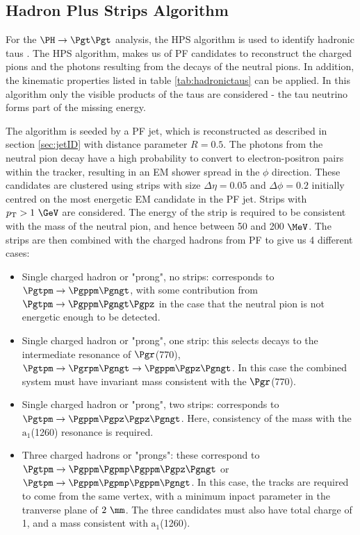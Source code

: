\subsection{Hadron Plus Strips Algorithm}
\label{sec:hps}

For the $\PH \to \Pgt\Pgt$ analysis, the \ac{HPS} algorithm is used to identify
hadronic taus \cite{CMS-PAS-TAU-11-001}. The \ac{HPS} algorithm, makes us of \ac{PF} candidates to reconstruct the
charged pions and the photons resulting from the decays of the neutral pions. In
addition, the kinematic properties listed in table \ref{tab:hadronictaus} can be
applied. In this algorithm only the visible products of the taus are considered
- the tau neutrino forms part of the missing energy.

The algorithm is seeded by a \ac{PF} jet, which is reconstructed as described in
section \ref{sec:jetID} with distance parameter $R=0.5$. The photons from the neutral pion decay have a high
probability to convert to electron-positron pairs within the tracker, resulting
in an EM shower spread in the $\phi$ direction. These candidates are clustered
using strips with size $\Delta\eta = 0.05$ and $\Delta\phi = 0.2$ initially
centred on the most energetic EM candidate in the \ac{PF} jet. Strips with
$\pt>1~\GeV$ are considered. The energy of the
strip is required to be consistent with the mass of the neutral pion, and hence
between 50 and 200 $\MeV$. The strips are then combined with the charged hadrons
from \ac{PF} to give us 4 different cases:

\begin{itemize}
\item Single charged hadron or "prong", no strips: corresponds to $\Pgtpm\to\Pgppm\Pgngt$,
with some contribution from $\Pgtpm\to\Pgppm\Pgngt\Pgpz$ in the case that the
neutral pion is not energetic enough to be detected.
\item Single charged hadron or "prong", one strip: this selects decays to the intermediate
resonance of $\Pgr$(770), $\Pgtpm\to\Pgrpm\Pgngt\to\Pgppm\Pgpz\Pgngt$. In this
case the combined system must have invariant mass consistent with the
$\Pgr$(770).
\item Single charged hadron or "prong", two strips: corresponds to
$\Pgtpm\to\Pgppm\Pgpz\Pgpz\Pgngt$. Here, consistency of the mass with the
$\text{a}_{1}$(1260) resonance is required. 
\item Three charged hadrons or "prongs": these correspond to
$\Pgtpm\to\Pgppm\Pgpmp\Pgppm\Pgpz\Pgngt$ or $\Pgtpm\to\Pgppm\Pgpmp\Pgppm\Pgngt$. 
In this case, the tracks are required
to come from the same vertex, with a minimum inpact parameter in the tranverse
plane of $2~\mm$. The three candidates must also have total charge of 1, and a
mass consistent with $\text{a}_{1}$(1260). 
\end{itemize}

